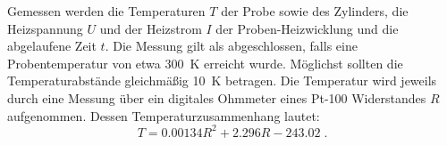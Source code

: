 Gemessen werden die Temperaturen $T$ der Probe sowie des Zylinders, die Heizspannung $U$ und der Heizstrom $I$ der Proben-Heizwicklung und die abgelaufene Zeit $t$.
Die Messung gilt als abgeschlossen, falls eine Probentemperatur von etwa \qty{300}{\kelvin} erreicht wurde.
Möglichst sollten die Temperaturabstände gleichmäßig \qty{10}{\kelvin} betragen. Die Temperatur wird jeweils durch eine Messung
über ein digitales Ohmmeter eines Pt-100 Widerstandes $R$ aufgenommen. Dessen Temperaturzusammenhang lautet:
\begin{equation}
    \label{eq:Temp}
    T = 0.00134 R^2 + 2.296 R - 243.02 \; .
\end{equation}